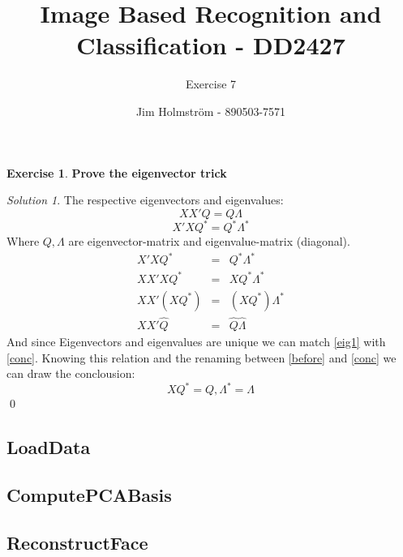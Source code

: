 \documentclass[a4paper,twoside=false,abstract=false,numbers=noenddot,
titlepage=false,headings=small,parskip=half,version=last]{scrartcl}
\author{Jim Holmström - 890503-7571}
\title{Image Based Recognition and Classification - DD2427}
\subtitle{Exercise 7}
\theoremstyle{definition}
\newtheorem{exercise}{Exercise}
\theoremstyle{remark}
\newtheorem*{solution}{Solution}
\begin{document}
\maketitle
\thispagestyle{empty}

\begin{exercise}
{\bf
Prove the eigenvector trick
}
\end{exercise}
\begin{solution}
The respective eigenvectors and eigenvalues:
\begin{equation}
    \label{eig1}
    XX'Q=Q\Lambda
\end{equation}
\begin{equation}
    X'XQ^*=Q^*\Lambda^*
\end{equation}
Where $Q,\Lambda$ are eigenvector-matrix and eigenvalue-matrix (diagonal).
\begin{eqnarray}
    X'XQ^*&=&Q^*\Lambda^* \\
    XX'XQ^*&=&XQ^*\Lambda^* \\ 
    \label{before}
    XX'(XQ^*)&=&(XQ^*)\Lambda^* \\
    \label{conc}
    XX'\hat{Q}&=&\hat{Q}\hat{\Lambda}
\end{eqnarray}
And since Eigenvectors and eigenvalues are unique we can match \eqref{eig1} with \eqref{conc}. Knowing this relation and the renaming between \eqref{before} and \eqref{conc} we can draw the conclousion:
\begin{equation}
    XQ^*=Q,\Lambda^*=\Lambda
\end{equation}
\qed


\end{solution}

\subsection{LoadData}
    

\subsection{ComputePCABasis}
    

\subsection{ReconstructFace}
    
\end{document}
